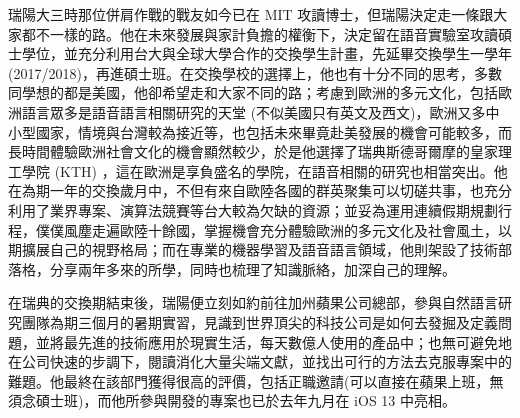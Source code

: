 \documentclass[14pt,UTF8,fntef]{memoir}
\begin{document}
瑞陽大三時那位併肩作戰的戰友如今已在 MIT 攻讀博士，但瑞陽決定走一條跟大家都不一樣的路。他在未來發展與家計負擔的權衡下，決定留在語音實驗室攻讀碩士學位，並充分利用台大與全球大學合作的交換學生計畫，先延畢交換學生一學年 (2017/2018)，再進碩士班。在交換學校的選擇上，他也有十分不同的思考，多數同學想的都是美國，他卻希望走和大家不同的路；考慮到歐洲的多元文化，包括歐洲語言眾多是語音語言相關研究的天堂 (不似美國只有英文及西文)，歐洲又多中小型國家，情境與台灣較為接近等，也包括未來畢竟赴美發展的機會可能較多，而長時間體驗歐洲社會文化的機會顯然較少，於是他選擇了瑞典斯德哥爾摩的皇家理工學院 (KTH) ，這在歐洲是享負盛名的學院，在語音相關的研究也相當突出。他在為期一年的交換歲月中，不但有來自歐陸各國的群英聚集可以切磋共事，也充分利用了業界專案、演算法競賽等台大較為欠缺的資源；並妥為運用連續假期規劃行程，僕僕風塵走遍歐陸十餘國，掌握機會充分體驗歐洲的多元文化及社會風土，以期擴展自己的視野格局；而在專業的機器學習及語音語言領域，他則架設了技術部落格，分享兩年多來的所學，同時也梳理了知識脈絡，加深自己的理解。


\vspace{1.5em}

在瑞典的交換期結束後，瑞陽便立刻如約前往加州蘋果公司總部，參與自然語言研究團隊為期三個月的暑期實習，見識到世界頂尖的科技公司是如何去發掘及定義問題，並將最先進的技術應用於現實生活，每天數億人使用的產品中；也無可避免地在公司快速的步調下，閱讀消化大量尖端文獻，並找出可行的方法去克服專案中的難題。他最終在該部門獲得很高的評價，包括正職邀請(可以直接在蘋果上班，無須念碩士班)，而他所參與開發的專案也已於去年九月在 iOS 13 中亮相。 

\end{document}
